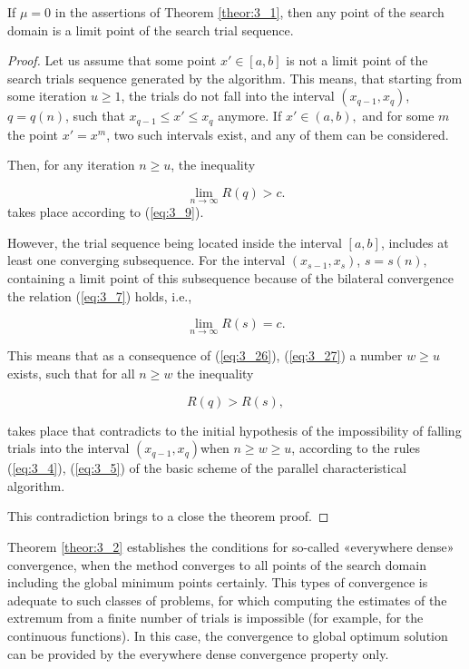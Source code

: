 	\begin{theorem} If $\mu = 0$ in the assertions of Theorem \ref{theor:3_1}, then any point of the search domain is a limit point of the search trial sequence.
	\label{theor:3_2}
	\end{theorem}
	\begin{proof} Let us assume that some point $x'\in [a,b]$ is not a limit point of the search trials sequence generated by the algorithm. This means, that starting from some iteration $u\ge 1$, the trials do not fall into the interval $(x_{q-1} ,x_{q} )$, $q=q(n)$, such that $x_{q-1} \le x'\le x_{q} $ anymore. If $x'\in (a,b),$ and for some $m$ the point $x'=x^{m} $, two such intervals exist, and any of them can be considered. 
	
	Then, for any iteration $n\ge u$, the inequality 
	
	\begin{equation}
	\label{eq:3_26}
	\mathop{\lim }\limits_{n\to \infty } R(q)>c.
	\end{equation}
	takes place according to  (\ref{eq:3_9}).
	
	However, the trial sequence being located inside the interval $[a,b]$, includes at least one converging subsequence. For the interval $(x_{s-1} ,x_{s} )$, $s=s(n),$ containing a limit point of this subsequence because of the bilateral convergence the relation  (\ref{eq:3_7}) holds, i.e., 
	
	\begin{equation}
	\label{eq:3_27}
	\mathop{\lim }\limits_{n\to \infty } R(s)=c.
	\end{equation}
	
	This means that as a consequence of  (\ref{eq:3_26}),  (\ref{eq:3_27}) a number $w\ge u$ exists, such that for all $n\ge w$ the inequality 
	
	\begin{equation*}
	R(q)>R(s),
	\end{equation*}
	
	takes place that contradicts to the initial hypothesis of the impossibility of falling trials into the interval $(x_{q-1} ,x_{q} )$when $n\ge w\ge u$, according to the rules  (\ref{eq:3_4}),  (\ref{eq:3_5}) of the basic scheme of the parallel characteristical algorithm.
	
	This contradiction brings to a close the theorem proof.
	\end{proof}
	
	Theorem \ref{theor:3_2} establishes the conditions for so-called «everywhere dense» convergence, when the method converges to all points of the search domain including the global minimum points certainly. This types of convergence is adequate to such classes of problems, for which computing the estimates of the extremum from a finite number of trials is impossible (for example, for the continuous functions). In this case, the convergence to global optimum solution can be provided by the everywhere dense convergence property only.
	
